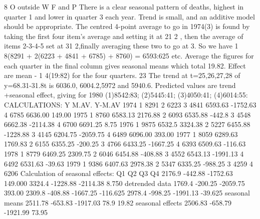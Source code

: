 \documentclass[a4paper,12pt]{article}
\begin{document}
\begin{enumerate}8
O outside W F and P
There is a clear seasonal pattern of deaths, highest in quarter 1 and lower in quarter
3 each year. Trend is small, and an additive model should be appropriate.
The centred 4-point average to go in 1974(3) is found by taking the first four item’s
average and setting it at 21
2 , then the average of items 2-3-4-5 set at 31
2,finally averaging
these two to go at 3. So we have 1
8(8291 + 2(6223 + 4841 + 6785) + 8760) = 6593:625
etc. Average the figures for each quarter in the final column gives seasonal means which
total 19.82. Effect are mean - 1
4(19:82) for the four quarters.
23
The trend at t=25,26,27,28 of y=68.31-31.8t is 6036.0, 6004.2,5972 and 5940.6. Predicted
values are trend +seasonal effect, giving for
1980 (1)8542:83; (2)5445:41; (3)4050:41; (4)6014:55:
CALCULATIONS:
Y M.AV. Y-M.AV
1974 1 8291
2 6223
3 4841 6593.63 -1752.63
4 6785 6636.00 149.00
1975 1 8760 6583.13 2176.88
2 6093 6535.88 -442.8
3 4548 6662.38 -2114.38
4 6700 6691.25 8.75
1976 1 9875 6532.5 3324.38
2 5227 6455.88 -1228.88
3 4145 6204.75 -2059.75
4 6489 6096.00 393.00
1977 1 8059 6289.63 1769.83
2 6155 6355.25 -200.25
3 4766 6433.25 -1667.25
4 6393 6509.63 -116.63
1978 1 8779 6469.25 2309.75
2 6046 6454.88 -408.88
3 4552 6543.13 -1991.13
4 6492 6531.63 -39.63
1979 1 9386 6407.63 2978.38
2 5347 6335.25 -988.25
3 4259
4 6206
Calculation of seasonal effects:
Q1 Q2 Q3 Q4
2176.9 -442.88 -1752.63 149.000
3324.4 -1228.88 -2114.38 8.750
detrended data 1769.4 -200.25 -2059.75 393.00
2309.8 -408.88 -1667.25 -116.625
2978.4 -998.25 -1991.13 -39.625
seasonal means 2511.78 -653.83 -1917.03 78.9 19.82
seasonal effects 2506.83 -658.79 -1921.99 73.95
\end{enumerate}
\end{document}
